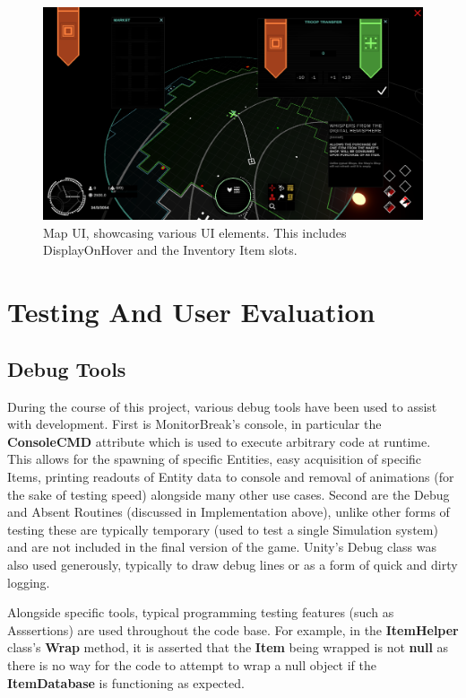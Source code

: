 \documentclass{report}
\begin{document}
\begin{figure}[H]
	\centering
    \includegraphics[width=.8\textwidth]{fullUIExample.png}
    \caption{Map UI, showcasing various UI elements. This includes DisplayOnHover and the Inventory Item slots.}
\end{figure}

\chapter{Testing And User Evaluation}

\section{Debug Tools}

During the course of this project, various debug tools have been used to assist with development. First is MonitorBreak's console, in particular the \textbf{ConsoleCMD} attribute which is used to execute arbitrary code at runtime. This allows for the spawning of specific Entities, easy acquisition of specific Items, printing readouts of Entity data to console and removal of animations (for the sake of testing speed) alongside many other use cases. Second are the Debug and Absent Routines (discussed in Implementation above), unlike other forms of testing these are typically temporary (used to test a single Simulation system) and are not included in the final version of the game. Unity's Debug class was also used generously, typically to draw debug lines or as a form of quick and dirty logging.

Alongside specific tools, typical programming testing features (such as Asssertions) are used throughout the code base. For example, in the \textbf{ItemHelper} class's \textbf{Wrap} method, it is asserted that the \textbf{Item} being wrapped is not \textbf{null} as there is no way for the code to attempt to wrap a null object if the \textbf{ItemDatabase} is functioning as expected.
\end{document}
